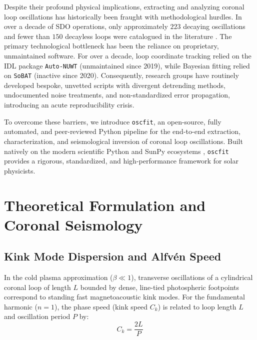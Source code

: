 \documentclass[11pt,a4paper]{article}
\begin{document}
Despite their profound physical implications, extracting and analyzing coronal loop oscillations has historically been fraught with methodological hurdles. In over a decade of SDO operations, only approximately $223$ decaying oscillations and fewer than $150$ decayless loops were catalogued in the literature \citep{Nechaeva2019, Shrivastav2024}. The primary technological bottleneck has been the reliance on proprietary, unmaintained software. For over a decade, loop coordinate tracking relied on the IDL package \texttt{Auto-NUWT} (unmaintained since 2019), while Bayesian fitting relied on \texttt{SoBAT} (inactive since 2020). Consequently, research groups have routinely developed bespoke, unvetted scripts with divergent detrending methods, undocumented noise treatments, and non-standardized error propagation, introducing an acute reproducibility crisis.

To overcome these barriers, we introduce \texttt{oscfit}, an open-source, fully automated, and peer-reviewed Python pipeline for the end-to-end extraction, characterization, and seismological inversion of coronal loop oscillations. Built natively on the modern scientific Python and SunPy ecosystems \citep{SunPy2020}, \texttt{oscfit} provides a rigorous, standardized, and high-performance framework for solar physicists.

\section{Theoretical Formulation and Coronal Seismology}

\subsection{Kink Mode Dispersion and Alfvén Speed}

In the cold plasma approximation ($\beta \ll 1$), transverse oscillations of a cylindrical coronal loop of length $L$ bounded by dense, line-tied photospheric footpoints correspond to standing fast magnetoacoustic kink modes. For the fundamental harmonic ($n=1$), the phase speed (kink speed $C_k$) is related to loop length $L$ and oscillation period $P$ by:
\begin{equation}
    C_k = \frac{2L}{P}
    \label{eq:kink_speed}
\end{equation}
\end{document}
